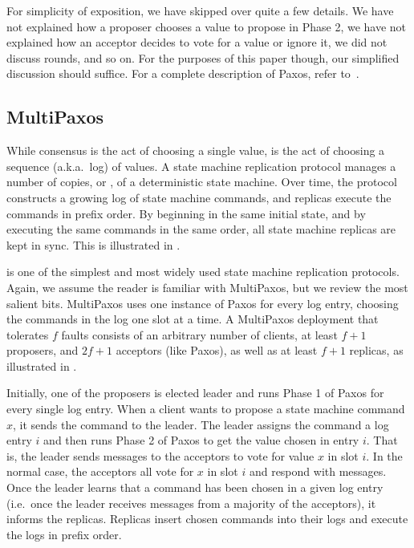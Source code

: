 {}

For simplicity of exposition, we have skipped over quite a few details. We have
not explained how a proposer chooses a value to propose in Phase 2, we have not
explained how an acceptor decides to vote for a value or ignore it, we did not
discuss rounds, and so on. For the purposes of this paper though, our
simplified discussion should suffice. For a complete description of Paxos,
refer to~\cite{lamport2001paxos}.

\subsection{MultiPaxos}
While consensus is the act of choosing a single value,  is the act of choosing a sequence (a.k.a.\ log) of values. A state
machine replication protocol manages a number of copies, or ,
of a deterministic state machine. Over time, the protocol constructs a growing
log of state machine commands, and replicas execute the commands in prefix
order.  By beginning in the same initial state, and by executing the same
commands in the same order, all state machine replicas are kept in sync. This
is illustrated in .

{}

 is one of the simplest and most widely used state machine
replication protocols. Again, we assume the reader is familiar with MultiPaxos,
but we review the most salient bits.
%
MultiPaxos uses one instance of Paxos for every log entry, choosing the
commands in the log one slot at a time.
%
A MultiPaxos deployment that tolerates $f$ faults consists of an arbitrary
number of clients, at least $f+1$ proposers, and $2f+1$ acceptors (like Paxos),
as well as at least $f+1$ replicas, as illustrated in
.

{}

Initially, one of the proposers is elected leader and runs Phase 1 of Paxos for
every single log entry. When a client wants to propose a state machine command
$x$, it sends the command to the leader. The leader assigns the command a log
entry $i$ and then runs Phase 2 of Paxos to get the value chosen in entry $i$.
That is, the leader sends  messages to the acceptors to vote
for value $x$ in slot $i$. In the normal case, the acceptors all vote for $x$
in slot $i$ and respond with  messages. Once the leader learns
that a command has been chosen in a given log entry (i.e.\ once the leader
receives  messages from a majority of the acceptors), it
informs the replicas. Replicas insert chosen commands into their logs and
execute the logs in prefix order.

